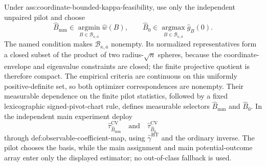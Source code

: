 Under ass:coordinate-bounded-kappa-feasibility, use only the independent unpaired pilot and choose
\[
\widehat B_{\mathrm{mm}}
\in\operatorname*{argmin}_{B\in\mathcal B_{\kappa,\overline a}}\widehat w(B),
\qquad
\widehat B_0
\in\operatorname*{argmax}_{B\in\mathcal B_{\kappa,\overline a}}\widehat g_B(0).
\]
The named condition makes \(\mathcal B_{\kappa,\overline a}\) nonempty.  Its normalized representatives form a closed subset of the product of two radius-\(\sqrt n\) spheres, because the coordinate-envelope and eigenvalue constraints are closed; the finite projective quotient is therefore compact.  The empirical criteria are continuous on this uniformly positive-definite set, so both optimizer correspondences are nonempty.  Their measurable dependence on the finite pilot statistics, followed by a fixed lexicographic signed-pivot-chart rule, defines measurable selectors \(\widehat B_{\mathrm{mm}}\) and \(\widehat B_0\).  In the independent main experiment deploy
\[
\widehat\tau_{\widehat B_{\mathrm{mm}}}^{\mathrm{CV}}
\quad\text{and}\quad
\widehat\tau_{\widehat B_0}^{\mathrm{CV}}
\]
through def:observable-coefficient-map, using \(\widehat\gamma^{\mathrm{HT}}\) and the ordinary inverse.  The pilot chooses the basis, while the main assignment and main potential-outcome array enter only the displayed estimator; no out-of-class fallback is used.